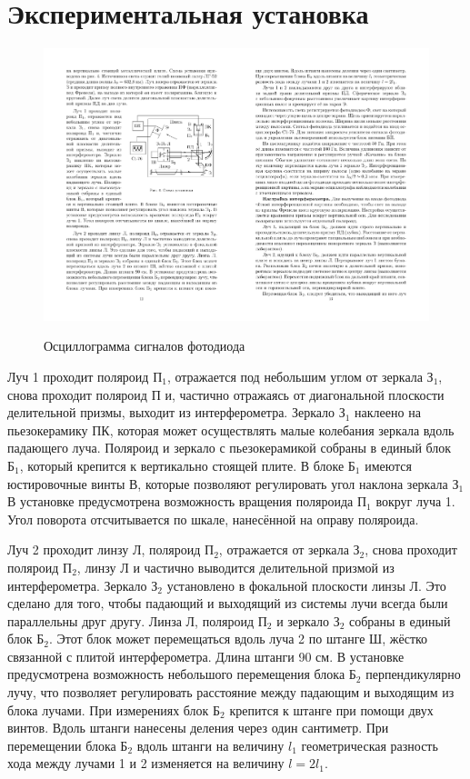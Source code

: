 \documentclass[a4paper,12pt]{article}
\begin{document}
\newpage

\section*{Экспериментальная установка}

\begin{figure}[h]
	\begin{center}
	\includegraphics[scale=1.5]{setup}
	\label{fig:setup}
	\caption{Осциллограмма сигналов фотодиода}
	\end{center}
\end{figure}

	Луч 1 проходит поляроид $П_1$, отражается под небольшим углом от зеркала $З_1$, снова проходит
	поляроид $П$ и, частично отражаясь от диагональной плоскости делительной призмы, выходит из интерферометра. Зеркало $З_1$ наклеено на пьезокерамику ПК, которая может осуществлять малые
	колебания зеркала вдоль падающего луча. Поляроид и зеркало с пьезокерамикой собраны в единый блок $Б_1$, который крепится к вертикально стоящей плите. В блоке $Б_1$ имеются юстировочные винты В, которые позволяют регулировать угол наклона зеркала $З_1$ В установке предусмотрена возможность вращения поляроида $П_1$ вокруг луча 1. Угол поворота отсчитывается по шкале, нанесённой на оправу поляроида.
	
	Луч 2 проходит линзу Л, поляроид $П_2$, отражается от зеркала $З_2$, снова проходит поляроид $П_2$, линзу Л и частично выводится делительной призмой из интерферометра. Зеркало $З_2$ установлено в фокальной плоскости линзы Л. Это сделано для того, чтобы падающий и выходящий из системы лучи всегда были параллельны друг другу. Линза Л, поляроид $П_2$ и зеркало $З_2$ собраны в единый блок $Б_2$. Этот блок может перемещаться вдоль луча 2 по штанге Ш, жёстко связанной с плитой интерферометра. Длина штанги 90 см. В установке предусмотрена возможность небольшого перемещения блока $Б_2$ перпендикулярно лучу, что позволяет регулировать расстояние между падающим и выходящим из блока лучами. При измерениях блок $Б_2$ крепится к штанге при помощи двух винтов. Вдоль штанги нанесены деления через один сантиметр. При перемещении блока $Б_2$ вдоль штанги на величину $ l_1 $ геометрическая разность хода между лучами 1 и 2 изменяется на величину $ l = 2l_1 $.
	
\end{document}
